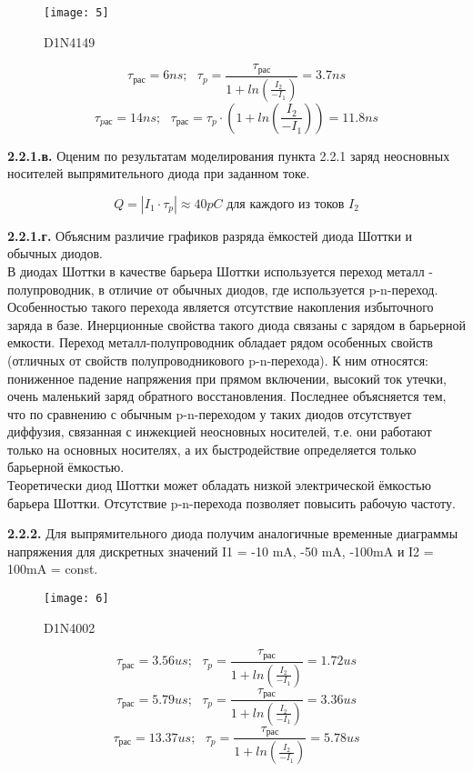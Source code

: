 \documentclass{semi}
\begin{document}
\begin{figure}[H]
	\centering
	\texttt{[image: 5]}
	\caption{D1N4149}
\end{figure}

\begin{center}
	\[ \tau_{рас} = 6 ns; \text{  } \tau_p = \dfrac{\tau_{рас}}{1+ln\left(\frac{I_2}{-I_1}\right)} = 3.7 ns\]
	\[ \tau_{pас} = 14 ns; \text{   } \tau_{рас} = \tau_{p}\cdot \left(1+ln\left(\frac{I_2}{-I_1}\right)\right) = 11.8 ns\] 
\end{center}

\textbf{{\normalsize 2.2.1.в.}}
Оценим по результатам моделирования пункта 2.2.1 заряд неосновных носителей выпрямительного диода при заданном токе.

\[Q=|I_1\cdot \tau_p| \approx 40 pC \text{ для каждого из токов } I_2\]


\textbf{{\normalsize 2.2.1.г.}}
Объясним различие графиков разряда ёмкостей диода Шоттки и обычных диодов.\\

В диодах Шоттки в качестве барьера Шоттки используется переход металл - полупроводник, в отличие от обычных диодов, где используется p-n-переход. Особенностью такого перехода является отсутствие накопления избыточного заряда в базе. Инерционные свойства такого диода связаны с зарядом в барьерной емкости. Переход металл-полупроводник обладает рядом особенных свойств (отличных от свойств полупроводникового p-n-перехода). К ним относятся: пониженное падение напряжения при прямом включении, высокий ток утечки, очень маленький заряд обратного восстановления. Последнее объясняется тем, что по сравнению с обычным p-n-переходом у таких диодов отсутствует диффузия, связанная с инжекцией неосновных носителей, т.е. они работают только на основных носителях, а их быстродействие определяется только барьерной ёмкостью.\\

Теоретически диод Шоттки может обладать низкой электрической ёмкостью барьера Шоттки. Отсутствие p-n-перехода позволяет повысить рабочую частоту.\\

\newpage

\textbf{{\normalsize 2.2.2.}}
Для выпрямительного диода получим аналогичные временные диаграммы напряжения для дискретных значений I1 = -10 mA, -50 mA, -100mA и I2 = 100mA = const.\\

\begin{figure}[H]
	\centering
	\texttt{[image: 6]}
	\caption{D1N4002}
\end{figure}

\begin{center}
	\[ \tau_{рас} = 3.56 us; \text{  } \tau_p = \dfrac{\tau_{рас}}{1+ln\left(\frac{I_2}{-I_1}\right)} = 1.72 us\]
	\[ \tau_{рас} = 5.79 us; \text{   } \tau_p = \dfrac{\tau_{рас}}{1+ln\left(\frac{I_2}{-I_1}\right)} = 3.36 us\] 
	\[ \tau_{рас} = 13.37 us; \text{   } \tau_p = \dfrac{\tau_{рас}}{1+ln\left(\frac{I_2}{-I_1}\right)} = 5.78 us\] 
\end{center}
\end{document}
